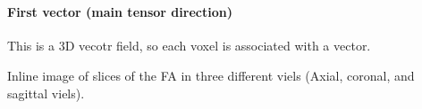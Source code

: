 \documentclass{article}
\begin{document}
    \begin{center}
    \end{center}
    { \hspace*{\fill} \\}
    
    \paragraph{First vector (main tensor
direction)}\label{first-vector-main-tensor-direction}

This is a 3D vecotr field, so each voxel is associated with a vector.

Inline image of slices of the FA in three different viels (Axial,
coronal, and sagittal viels).
\end{document}
